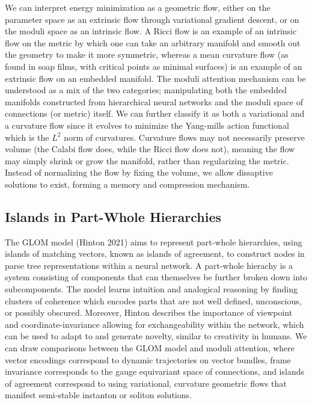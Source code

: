 \documentclass{article}
\begin{document}
    We can interpret energy minimization as a geometric flow, either on the parameter space as an extrinsic flow through variational gradient descent, or on the moduli space as an intrinsic flow. A Ricci flow is an example of an intrinsic flow on the metric by which one can take an arbitrary manifold and smooth out the geometry to make it more symmetric, whereas a mean curvature flow (as found in soap films, with critical points as minimal surfaces) is an example of an extrinsic flow on an embedded manifold. The moduli attention mechanism can be understood as a mix of the two categories; manipulating both the embedded manifolds constructed from hierarchical neural networks and the moduli space of connections (or metric) itself. We can further classify it as both a variational and a curvature flow since it evolves to minimize the Yang-mills action functional which is the $L^2$ norm of curvatures. 
    Curvature flows may not necessarily preserve volume (the Calabi flow does, while the Ricci flow does not), meaning the flow may simply shrink or grow the manifold, rather than regularizing the metric. Instead of normalizing the flow by fixing the volume, we allow dissaptive solutions to exist, forming a memory and compression mechanism. 

\subsection{Islands in Part-Whole Hierarchies}
    The GLOM model (Hinton 2021) aims to represent part-whole hierarchies, using islands of matching vectors, known as islands of agreement, to construct nodes in parse tree representations within a neural network. A part-whole hierachy is a system consisting of components that can themselves be further broken down into subcomponents. The model learns intuition and analogical reasoning by finding clusters of coherence which encodes parts that are not well defined, unconscious, or possibly obscured. Moreover, Hinton describes the importance of viewpoint and coordinate-invariance allowing for exchangeability within the network, which can be used to adapt to and generate novelty, similar to creativity in humans. We can draw comparisons between the GLOM model and moduli attention, where vector encodings correspond to dynamic trajectories on vector bundles, frame invariance corresponds to the gauge equivariant space of connections, and islands of agreement correspond to using variational, curvature geometric flows that manifest semi-stable instanton or soliton solutions. 
    
\end{document}
